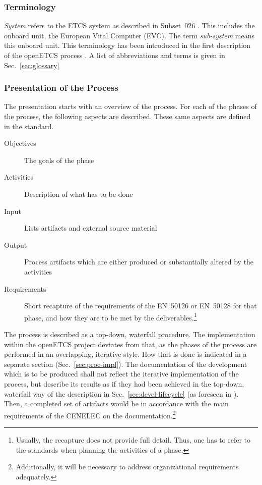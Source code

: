 \documentclass{template/openetcs_article}
\begin{document}
\subsubsection{Terminology}

\emph{System} refers to the ETCS system as described in Subset~026
\cite{subset-026:3.3.0}. This includes the onboard unit, the European
Vital Computer (EVC). The term \emph{sub-system} means this onboard
unit. This terminology has been introduced in the first description of
the openETCS process \cite{openETCS:D2.3}. A list of abbreviations and
terms is given in Sec.~\ref{sec:glossary} 

\subsubsection{Presentation of the Process}
\label{sec:presentation-process}

The presentation starts with an overview of the process. 
For each of the phases of the process, the following aspects are
described. These same aspects are defined in the standard.
\begin{description}
\item[Objectives] The goals of the phase
\item[Activities] Description of what has to be done
\item[Input] Lists artifacts and external source material
\item[Output] Process artifacts which are either produced or
  substantially altered by the activities
\item[Requirements] Short recapture of the
  requirements of the EN~50126 or EN~50128 for that phase, and how
  they are to be met by the deliverables.\footnote{Usually, the recapture does
    not provide full detail. Thus, one has to refer to the standards
    when planning the activities of a phase.}
\end{description}
%
The process is described as a top-down, waterfall procedure. The
implementation within the openETCS project deviates from that, as the
phases of the process are performed in an overlapping, iterative
style. How that is done is indicated in a separate section
(Sec.~\ref{sec:proc-impl}). The documentation of the development which
is to be produced shall not reflect the iterative implementation of
the process, but describe its results as if they had been achieved in
the top-down, waterfall way of the description in
Sec.~\ref{sec:devel-lifecycle} (as foreseen in
\cite[7.1.2.2]{EN50128:2011}). Then, a completed set of artifacts
would be in accordance with the main requirements of the CENELEC on
the documentation.\footnote{Additionally, it will be necessary to
  address organizational requirements adequately.}
\end{document}
